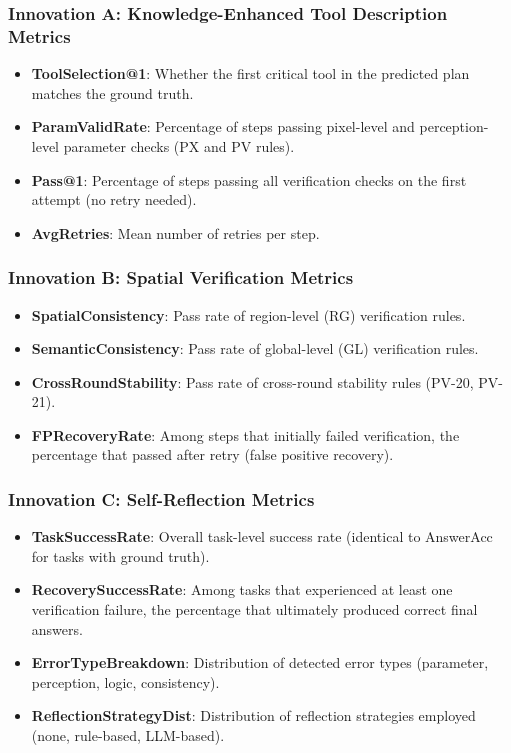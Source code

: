 \documentclass[journal]{IEEEtran}
\begin{document}
\subsubsection{Innovation A: Knowledge-Enhanced Tool Description Metrics}
\begin{itemize}[leftmargin=*]
    \item \textbf{ToolSelection@1}: Whether the first critical tool in the predicted plan matches the ground truth.
    \item \textbf{ParamValidRate}: Percentage of steps passing pixel-level and perception-level parameter checks (PX and PV rules).
    \item \textbf{Pass@1}: Percentage of steps passing all verification checks on the first attempt (no retry needed).
    \item \textbf{AvgRetries}: Mean number of retries per step.
\end{itemize}

\subsubsection{Innovation B: Spatial Verification Metrics}
\begin{itemize}[leftmargin=*]
    \item \textbf{SpatialConsistency}: Pass rate of region-level (RG) verification rules.
    \item \textbf{SemanticConsistency}: Pass rate of global-level (GL) verification rules.
    \item \textbf{CrossRoundStability}: Pass rate of cross-round stability rules (PV-20, PV-21).
    \item \textbf{FPRecoveryRate}: Among steps that initially failed verification, the percentage that passed after retry (false positive recovery).
\end{itemize}

\subsubsection{Innovation C: Self-Reflection Metrics}
\begin{itemize}[leftmargin=*]
    \item \textbf{TaskSuccessRate}: Overall task-level success rate (identical to AnswerAcc for tasks with ground truth).
    \item \textbf{RecoverySuccessRate}: Among tasks that experienced at least one verification failure, the percentage that ultimately produced correct final answers.
    \item \textbf{ErrorTypeBreakdown}: Distribution of detected error types (parameter, perception, logic, consistency).
    \item \textbf{ReflectionStrategyDist}: Distribution of reflection strategies employed (none, rule-based, LLM-based).
\end{itemize}
\end{document}
